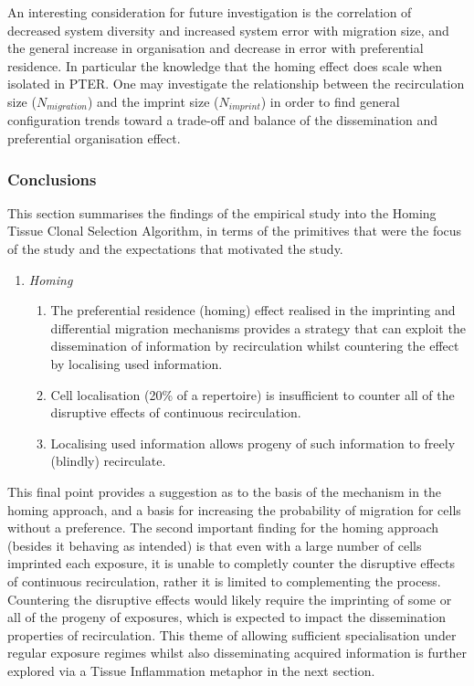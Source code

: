 An interesting consideration for future investigation is the correlation of decreased system diversity and increased system error with migration size, and the general increase in organisation and decrease in error with preferential residence. In particular the knowledge that the homing effect does scale when isolated in PTER. One may investigate the relationship between the recirculation size ($N_{migration}$) and the imprint size ($N_{imprint}$) in order to find general configuration trends toward a trade-off and balance of the dissemination and preferential organisation effect.

%
%
\subsubsection{Conclusions}
This section summarises the findings of the empirical study into the Homing Tissue Clonal Selection Algorithm, in terms of the primitives that were the focus of the study and the expectations that motivated the study.

\begin{enumerate}
	\item \emph{Homing}
		\begin{enumerate}
			\item The preferential residence (homing) effect realised in the imprinting and differential migration mechanisms provides a strategy that can exploit the dissemination of information by recirculation whilst countering the effect by localising used information.
			\item Cell localisation (20\% of a repertoire) is insufficient to counter all of the disruptive effects of continuous recirculation. 
			\item Localising used information allows progeny of such information to freely (blindly) recirculate.			
		\end{enumerate}			
\end{enumerate}

This final point provides a suggestion as to the basis of the mechanism in the homing approach, and a basis for increasing the probability of migration for cells without a preference. The second important finding for the homing approach (besides it behaving as intended) is that even with a large number of cells imprinted each exposure, it is unable to completly counter the disruptive effects of continuous recirculation, rather it is limited to complementing the process. Countering the disruptive effects would likely require the imprinting of some or all of the progeny of exposures, which is expected to impact the dissemination properties of recirculation. This theme of allowing sufficient specialisation under regular exposure regimes whilst also disseminating acquired information is further explored via a Tissue Inflammation metaphor in the next section.

